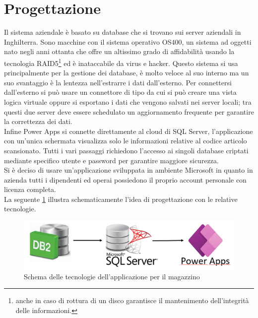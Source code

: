 \section{Progettazione}\label{sec:1App-Progettazione}
Il sistema aziendale  è basato su database  che si trovano sui server aziendali in Inghilterra.
Sono macchine  con il sistema operativo OS400, un sistema ad oggetti nato negli anni ottanta che offre un altissimo grado di affidabilità usando la tecnologia RAID5\footnote{anche in caso di rottura di un disco garantisce il mantenimento dell'integrità delle informazioni.} ed è inataccabile da virus e hacker.
Questo sistema si usa principalmente per la gestione dei database, è molto veloce al suo interno ma un suo svantaggio è la lentezza nell’estrarre i dati dall’esterno. 
Per connettersi dall’esterno si può usare un connettore di tipo  da cui si può creare una vista logica virtuale oppure si esportano i dati che vengono salvati nei server locali; tra questi due server deve essere schedulato un aggiornamento frequente per garantire la correttezza dei dati.\\
Infine Power Apps si connette direttamente al cloud di SQL Server, l’applicazione con un’unica schermata visualizza solo le informazioni relative al codice articolo scansionato. 
Tutti i vari passaggi richiedono l’accesso ai singoli database criptati mediante specifico utente e password per garantire maggiore sicurezza.\\
Si è deciso di usare un’applicazione sviluppata in ambiente Microsoft in quanto in azienda tutti i dipendenti ed operai possiedono il proprio account personale con licenza completa.\\
La seguente \figurename \space \ref*{fig:M-Schema} illustra schematicamente l'idea di progettazione con le relative tecnologie.
\begin{figure}[H]
  \centering\includegraphics[width=1.0\textwidth, height=1.0\textheight,keepaspectratio]{immagini/M-schema.png}
  \caption{Schema delle tecnologie dell'applicazione per il magazzino}
  \label{fig:M-Schema}
\end{figure}

